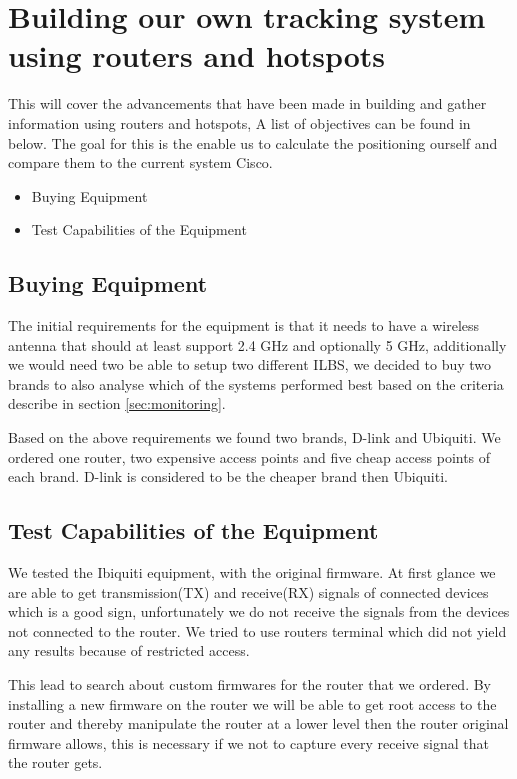 \section{Building our own tracking system using routers and hotspots}
This will cover the advancements that have been made in building and gather information using routers and hotspots, A list of objectives can be found in below. The goal for this is the enable us to calculate the positioning ourself and compare them to the current system Cisco.

\begin{itemize}
	\item Buying Equipment
	\item Test Capabilities of the Equipment
\end{itemize}

\subsection*{Buying Equipment}
The initial requirements for the equipment is that it needs to have a wireless antenna that should at least support 2.4 GHz and optionally 5 GHz, additionally we would need two be able to setup two different ILBS, we decided to buy two brands to also analyse which of the systems performed best based on the criteria describe in section \ref{sec:monitoring}.

Based on the above requirements we found two brands, D-link and Ubiquiti. We ordered one router, two expensive access points and five cheap access points of each brand. D-link is considered to be the cheaper brand then Ubiquiti.

\subsection*{Test Capabilities of the Equipment}
We tested the Ibiquiti equipment, with the original firmware. At first glance we are able to get transmission(TX) and receive(RX) signals of connected devices which is a good sign, unfortunately we do not receive the signals from the devices not connected to the router. We tried to use routers terminal which did not yield any results because of restricted access.

This lead to search about custom firmwares for the router that we ordered. By installing a new firmware on the router we will be able to get root access to the router and thereby manipulate the router at a lower level then the router original firmware allows, this is necessary if we not to capture every receive signal that the router gets.

